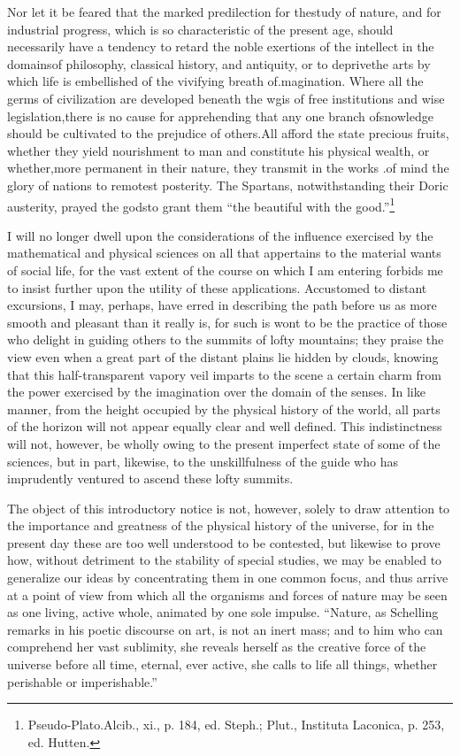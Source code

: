 Nor let it be feared that the marked predilection for thestudy of nature, and for industrial progress, which is so characteristic of the present age, should necessarily have a tendency to retard the noble exertions of the intellect in the domainsof philosophy, classical history, and antiquity, or to deprivethe arts by which life is embellished of the vivifying breath of.magination. Where all the germs of civilization are developed beneath the wgis of free institutions and wise legislation,there is no cause for apprehending that any one branch ofsnowledge should be cultivated to the prejudice of others.All afford the state precious fruits, whether they yield nourishment to man and constitute his physical wealth, or whether,more permanent in their nature, they transmit in the works .of mind the glory of nations to remotest posterity. The Spartans, notwithstanding their Doric austerity, prayed the godsto grant them ``the beautiful with the good.''\footnote{Pseudo-Plato.Alcib., xi., p. 184, ed. Steph.; Plut., Instituta Laconica, p. 253, ed. Hutten.}

I will no longer dwell upon the considerations of the influence exercised by the mathematical and physical sciences on all that appertains to the material wants of social life, for the vast extent of the course on which I am entering forbids me to insist further upon the utility of these applications. Accustomed to distant excursions, I may, perhaps, have erred in describing the path before us as more smooth and pleasant than it really is, for such is wont to be the practice of those who delight in guiding others to the summits of lofty mountains; they praise the view even when a great part of the distant plains lie hidden by clouds, knowing that this half-transparent vapory veil imparts to the scene a certain charm from the power exercised by the imagination over the domain of the senses. In like manner, from the height occupied by the physical history of the world, all parts of the horizon will not appear equally clear and well defined. This indistinctness will not, however, be wholly owing to the present imperfect state of some of the sciences, but in part, likewise, to the unskillfulness of the guide who has imprudently ventured to ascend these lofty summits.

The object of this introductory notice is not, however, solely to draw attention to the importance and greatness of the physical history of the universe, for in the present day these are too well understood to be contested, but likewise to prove how, without detriment to the stability of special studies, we may be enabled to generalize our ideas by concentrating them in one common focus, and thus arrive at a point of view from which all the organisms and forces of nature may be seen as one living, active whole, animated by one sole impulse. ``Nature, as Schelling remarks in his poetic discourse on art, is not an inert mass; and to him who can comprehend her vast sublimity, she reveals herself as the creative force of the universe before all time, eternal, ever active, she calls to life all things, whether perishable or imperishable.''

